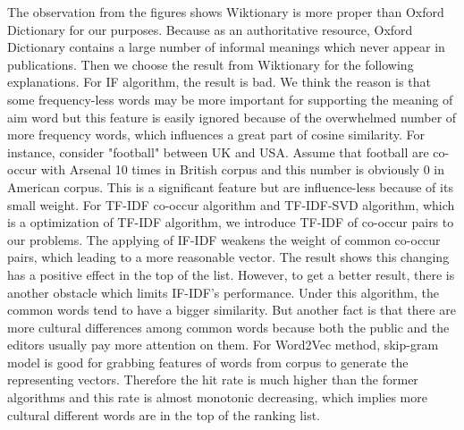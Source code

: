 The observation from the figures shows Wiktionary is more proper than Oxford Dictionary for our purposes. Because as an authoritative resource, Oxford Dictionary contains a large number of informal meanings which never appear in publications.
Then we choose the result from Wiktionary for the following explanations.  
For IF algorithm, the result is bad. We think the reason is that some frequency-less words may be more important for supporting the meaning of aim word but this feature is easily ignored because of the overwhelmed number of more frequency words, which influences a great part of cosine similarity. For instance, consider "football" between UK and USA. Assume that football are co-occur with Arsenal 10 times in British corpus and this number is obviously 0 in American corpus. This is a significant feature but are influence-less because of its small weight.
For TF-IDF co-occur algorithm and TF-IDF-SVD algorithm, which is a optimization of TF-IDF algorithm, we introduce TF-IDF of co-occur pairs to our problems. The applying of IF-IDF weakens the weight of common co-occur pairs, which leading to a more reasonable vector. The result shows this changing has a positive effect in the top of the list. However, to get a better result, there is another obstacle which limits IF-IDF's performance. Under this algorithm, the common words tend to have a bigger similarity. But another fact is that there are more cultural differences among common words because both the public and the editors usually pay more attention on them.
For Word2Vec method, skip-gram model is good for grabbing features of words from corpus to generate the representing vectors. Therefore the hit rate is much higher than the former algorithms and this rate is almost monotonic decreasing, which implies more cultural different words are in the top of the ranking list.
